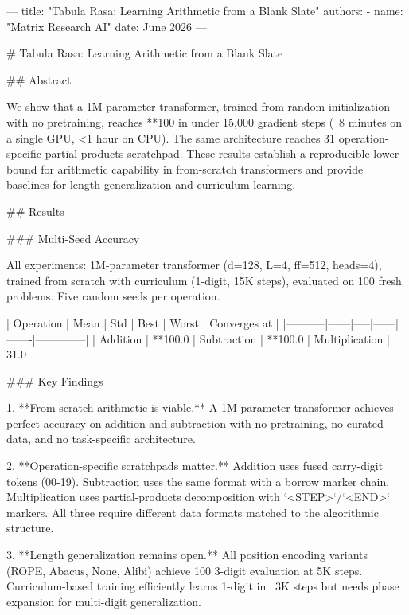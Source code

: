 ---
title: "Tabula Rasa: Learning Arithmetic from a Blank Slate"
authors:
  - name: "Matrix Research AI"
date: June 2026
---

# Tabula Rasa: Learning Arithmetic from a Blank Slate

## Abstract

We show that a 1M-parameter transformer, trained from random initialization
with no pretraining, reaches **100%
in under 15,000 gradient steps (~8 minutes on a single GPU, <1 hour on CPU).
The same architecture reaches 31%
operation-specific partial-products scratchpad. These results establish a
reproducible lower bound for arithmetic capability in from-scratch
transformers and provide baselines for length generalization and curriculum
learning.

## Results

### Multi-Seed Accuracy

All experiments: 1M-parameter transformer (d=128, L=4, ff=512, heads=4),
trained from scratch with curriculum (1-digit, 15K steps), evaluated on
100 fresh problems. Five random seeds per operation.

| Operation | Mean | Std | Best | Worst | Converges at |
|-----------|------|-----|------|-------|--------------|
| Addition | **100.0%
| Subtraction | **100.0%
| Multiplication | 31.0%

### Key Findings

1. **From-scratch arithmetic is viable.** A 1M-parameter transformer
   achieves perfect accuracy on addition and subtraction with no pretraining,
   no curated data, and no task-specific architecture.

2. **Operation-specific scratchpads matter.** Addition uses fused
   carry-digit tokens (00-19). Subtraction uses the same format with a
   borrow marker chain. Multiplication uses partial-products decomposition
   with `<STEP>`/`<END>` markers. All three require different data
   formats matched to the algorithmic structure.

3. **Length generalization remains open.** All position encoding variants
   (ROPE, Abacus, None, Alibi) achieve 100%
   3-digit evaluation at 5K steps. Curriculum-based training efficiently
   learns 1-digit in ~3K steps but needs phase expansion for multi-digit
   generalization.


